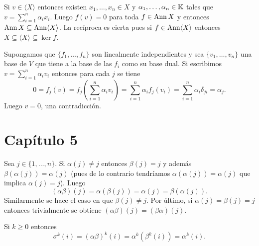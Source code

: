 \begin{solution}[ejercicio~\ref{xca:annX=<X>}]
    Si $v\in\langle X\rangle$ entonces existen $x_1,\dots,x_n\in X$ y
    $\alpha_1,\dots,\alpha_n\in\mathbb{K}$ tales que $v=\sum_{i=1}^n\alpha_ix_i$.
    Luego $f(v)=0$ para toda $f\in\operatorname{Ann} X$ y entonces $\operatorname{Ann}
    X\subseteq\operatorname{Ann}\langle X\rangle$. La recíproca es cierta pues si
    $f\in\operatorname{Ann}\langle X\rangle$ entonces $X\subseteq\langle
    X\rangle\subseteq\ker f$.
\end{solution}

\begin{solution}
	Supongamos que $\{f_1,\dots,f_n\}$ son linealmente independientes y sea
	$\{v_1,\dots,v_n\}$ una base de $V$ que tiene a la base de las $f_i$ como
	su base dual. Si escribimos $v=\sum_{i=1}^n\alpha_iv_i$ entonces para cada
	$j$ se tiene 
	\[
	0=f_j(v)=f_j\left(\sum_{i=1}^n\alpha_iv_i\right)=\sum_{i=1}^n\alpha_if_j(v_i)=\sum_{i=1}^n\alpha_i\delta_{ji}=\alpha_j.
	\]
	Luego $v=0$, una contradicción.
\end{solution}

\section{Capítulo 5}

\begin{solution}
	Sea $j\in\{1,\dots,n\}$. Si $\alpha(j)\ne j$ entonces $\beta(j)=j$ y además
	$\beta(\alpha(j))=\alpha(j)$ (pues de lo contrario tendríamos
	$\alpha(\alpha(j))=\alpha(j)$ que implica $\alpha(j)=j$). Luego
	\[
		(\alpha\beta)(j)=\alpha(\beta(j))=\alpha(j)=\beta(\alpha(j)).
	\]
	Similarmente se hace el caso en que $\beta(j)\ne j$. Por último, si
	$\alpha(j)=\beta(j)=j$ entonces trivialmente se obtiene
	$(\alpha\beta)(j)=(\beta\alpha)(j)$. 
\end{solution}

\begin{solution}
	Si $k\geq0$ entonces
	\[
		\sigma^{k}(i)=(\alpha\beta)^{k}(i)=\alpha^{k}\left(\beta^{k}(i)\right)=\alpha^{k}(i). 
	\]
\end{solution}

